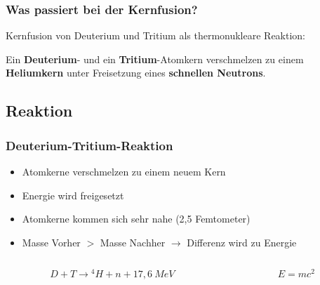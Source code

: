 \documentclass[aspectratio=169]{beamer}
\begin{document}
      \begin{frame}
        \frametitle{Was passiert bei der Kernfusion?}
        \center
        Kernfusion von Deuterium und Tritium als thermonukleare Reaktion:

        \bigskip
        \pause

        \bigskip

        Ein \textbf{Deuterium}- und ein \textbf{Tritium}-Atomkern verschmelzen zu einem \textbf{Heliumkern} unter Freisetzung eines \textbf{schnellen Neutrons}.

      \end{frame}

    \subsection{Reaktion}

      \begin{frame}
        \frametitle{Deuterium-Tritium-Reaktion}
        \begin{itemize}
          \item Atomkerne verschmelzen zu einem neuem Kern
          \item Energie wird freigesetzt
          \item Atomkerne kommen sich sehr nahe (2,5 Femtometer)
          \item Masse Vorher \( > \) Masse Nachher \( \rightarrow \) Differenz wird zu Energie
        \end{itemize}
        \bigskip

        \begin{columns}[T]
          \begin{column}{0.5\textwidth}
            \begin{equation*}
              D + T \rightarrow {}^4 H + n + 17,6~MeV
            \end{equation*}
          \end{column}
          \begin{column}{0.5\textwidth}
            \begin{equation*}
              E = mc^2
            \end{equation*}
          \end{column}
        \end{columns}
      \end{frame}
\end{document}
